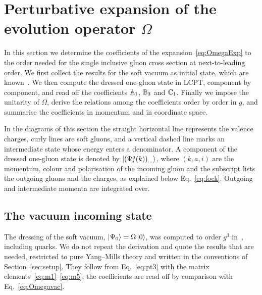 \section{Perturbative expansion of the evolution operator \texorpdfstring{$\Omega$}{Omega}}\label{sec:omega}

In this section we determine the coefficients of the expansion~\eqref{eq:OmegaExp} to the order needed for the single inclusive gluon cross section at next-to-leading order. We first collect the results for the soft vacuum as initial state, which are known~\cite{Lublinsky:2016meo}. We then compute the dressed one-gluon state in LCPT, component by component, and read off the coefficients $\mathbb{A}_1$, $\mathbb{B}_3$ and $\mathbb{C}_1$. Finally we impose the unitarity of $\Omega$, derive the relations among the coefficients order by order in $g$, and summarise the coefficients in momentum and in coordinate space.

In the diagrams of this section the straight horizontal line represents the valence charges, curly lines are soft gluons, and a vertical dashed line marks an intermediate state whose energy enters a denominator. A component of the dressed one-gluon state is denoted by $\ket{(\Psi^a_i(k))_{\dots}}$, where $(k,a,i)$ are the momentum, colour and polarisation of the incoming gluon and the subscript lists the outgoing gluons and the charges, as explained below Eq.~\eqref{eq:fock}. Outgoing and intermediate momenta are integrated over.

\subsection{The vacuum incoming state}\label{sec:vacin}

The dressing of the soft vacuum, $\ket{\Psi_0}=\Omega\ket0$, was computed to order $g^3$ in~\cite{Lublinsky:2016meo}, including quarks. We do not repeat the derivation and quote the results that are needed, restricted to pure Yang--Mills theory and written in the conventions of Section~\ref{sec:setup}. They follow from Eq.~\eqref{eq:pt3} with the matrix elements~\eqref{eq:m1}--\eqref{eq:m5}; the coefficients are read off by comparison with Eq.~\eqref{eq:Omegavac}.

